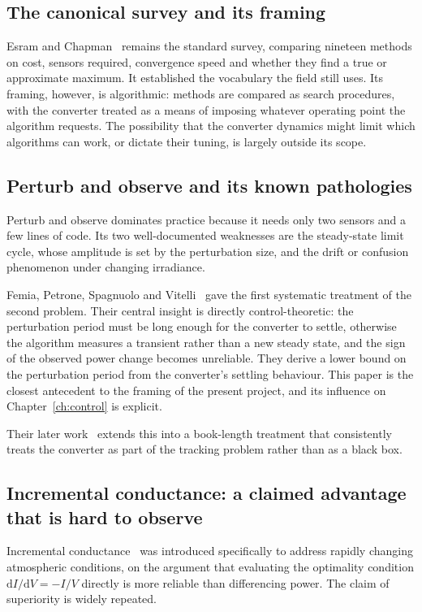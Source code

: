 \subsection{The canonical survey and its framing}

Esram and Chapman~\cite{esram} remains the standard survey, comparing nineteen
methods on cost, sensors required, convergence speed and whether they find a
true or approximate maximum. It established the vocabulary the field still uses.
Its framing, however, is algorithmic: methods are compared as search procedures,
with the converter treated as a means of imposing whatever operating point the
algorithm requests. The possibility that the converter dynamics might limit
which algorithms can work, or dictate their tuning, is largely outside its
scope.

\subsection{Perturb and observe and its known pathologies}

Perturb and observe dominates practice because it needs only two sensors and a
few lines of code. Its two well-documented weaknesses are the steady-state
limit cycle, whose amplitude is set by the perturbation size, and the drift or
confusion phenomenon under changing irradiance.

Femia, Petrone, Spagnuolo and Vitelli~\cite{femia} gave the first systematic
treatment of the second problem. Their central insight is directly
control-theoretic: the perturbation period must be long enough for the converter
to settle, otherwise the algorithm measures a transient rather than a new
steady state, and the sign of the observed power change becomes unreliable. They
derive a lower bound on the perturbation period from the converter's settling
behaviour. This paper is the closest antecedent to the framing of the present
project, and its influence on Chapter~\ref{ch:control} is explicit.

Their later work~\cite{femia_book} extends this into a book-length treatment
that consistently treats the converter as part of the tracking problem rather
than as a black box.

\subsection{Incremental conductance: a claimed advantage that is hard to observe}

Incremental conductance~\cite{hussein} was introduced specifically to address
rapidly changing atmospheric conditions, on the argument that evaluating the
optimality condition $\mathrm{d}I/\mathrm{d}V = -I/V$ directly is more reliable
than differencing power. The claim of superiority is widely repeated.

